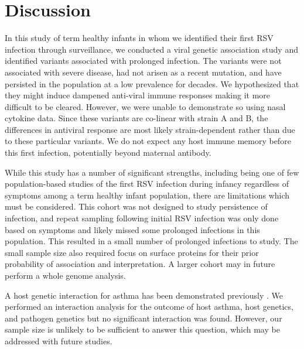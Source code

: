 \documentclass{article} %
\begin{document}
\section{Discussion}
In this study of term healthy infants in whom we identified their first RSV infection through surveillance, we conducted a viral genetic association study and identified variants associated with prolonged infection. 
The variants were not associated with severe disease, had not arisen as a recent mutation, and have persisted in the population at a low prevalence for decades.
We hypothesized that they might induce dampened anti-viral immune responses making it more difficult to be cleared. 
However, we were unable to demonstrate so using nasal cytokine data.
Since these variants are co-linear with strain A and B, the differences in antiviral response are most likely strain-dependent rather than due to these particular variants.
We do not expect any host immune memory before this first infection, potentially beyond maternal antibody.

While this study has a number of significant strengths, including being one of few population-based studies of the first RSV infection during infancy regardless of symptoms among a term healthy infant population, there are limitations which must be considered.
This cohort was not designed to study persistence of infection, and repeat sampling following initial RSV infection was only done based on symptoms and likely missed some prolonged infections in this population. 
This resulted in a small number of prolonged infections to study.
The small sample size also required focus on surface proteins for their prior probability of association and interpretation.
A larger cohort may in future perform a whole genome analysis.

A host genetic interaction for asthma has been demonstrated previously 
\citep{moffatt2010large}.
We performed an interaction analysis for the outcome of host asthma, host genetics, and pathogen genetics 
but no significant interaction was found. 
However, our sample size is unlikely to be sufficient to answer this question, 
which may be addressed with future studies. 
\end{document}

